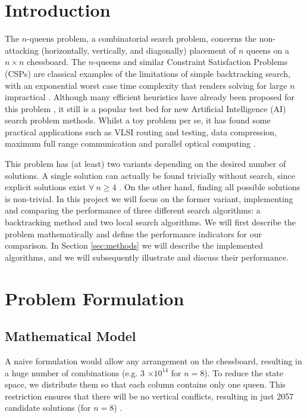 \section{Introduction}

The $n$-queens problem, a combinatorial search problem, concerns the non-attacking (horizontally, vertically, and diagonally) placement of $n$ queens on a $n\times n$ chessboard. The $n$-queens and similar Constraint Satisfaction Problems (CSPs) are classical examples of the limitations of simple backtracking search, with an exponential worst case time complexity that renders solving for large $n$ impractical \citep{sosic90, backtracking}. Although many efficient heuristics have already been proposed for this problem \citep{sosic91, hu03, aima, engel07, agarwal12}, it still is a popular test bed for new Artificial Intelligence (AI) search problem methods. Whilst a toy problem per se, it has found some practical applications such as VLSI routing and testing, data compression, maximum full range communication and parallel optical computing \citep{sosic91, hu03}.

This problem has (at least) two variants depending on the desired number of solutions. A single solution can actually be found trivially without search, since explicit solutions exist $\forall \ n \ge 4$ \citep{trivial}. On the other hand, finding all possible solutions is non-trivial. In this project we will focus on the former variant, implementing and comparing the performance of three different search algorithms: a backtracking method and two local search algorithms. We will first describe the problem mathematically and define the performance indicators for our comparison. In Section \ref{sec:methods} we will describe the implemented algorithms, and we will subsequently illustrate and discuss their performance.

\section{Problem Formulation}

\subsection{Mathematical Model}

A naive formulation would allow any arrangement on the chessboard, resulting in a huge number of combinations (e.g. 3 $\times 10^{14}$ for $n=8$). To reduce the state space, we distribute them so that each column contains only one queen. This restriction ensures that there will be no vertical conflicts, resulting in just 2057 candidate solutions (for $n=8$) \citep{aima}.

